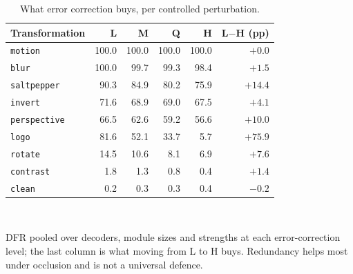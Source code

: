 \begin{table}[htbp]
\centering\small
\caption{What error correction buys, per controlled perturbation.}
\label{tab:qr_ec}
\begin{tabular}{lrrrrr}
\toprule
Transformation & L & M & Q & H & L$-$H (pp) \\
\midrule
\texttt{motion} & 100.0 & 100.0 & 100.0 & 100.0 & $+0.0$ \\
\texttt{blur} & 100.0 & 99.7 & 99.3 & 98.4 & $+1.5$ \\
\texttt{saltpepper} & 90.3 & 84.9 & 80.2 & 75.9 & $+14.4$ \\
\texttt{invert} & 71.6 & 68.9 & 69.0 & 67.5 & $+4.1$ \\
\texttt{perspective} & 66.5 & 62.6 & 59.2 & 56.6 & $+10.0$ \\
\texttt{logo} & 81.6 & 52.1 & 33.7 & 5.7 & $+75.9$ \\
\texttt{rotate} & 14.5 & 10.6 & 8.1 & 6.9 & $+7.6$ \\
\texttt{contrast} & 1.8 & 1.3 & 0.8 & 0.4 & $+1.4$ \\
\texttt{clean} & 0.2 & 0.3 & 0.3 & 0.4 & $-0.2$ \\
\bottomrule
\end{tabular}
\\[4pt]
\begin{minipage}{0.86\linewidth}\footnotesize
DFR pooled over decoders, module sizes and strengths at each error-correction level; the last
column is what moving from L to H buys. Redundancy helps most under occlusion and is not a
universal defence.
\end{minipage}
\end{table}
